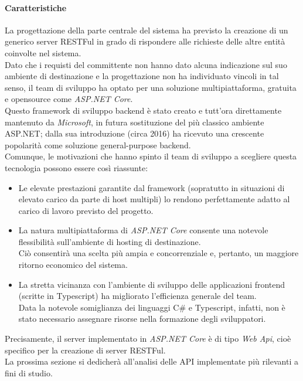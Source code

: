 \documentclass[12pt]{article}
\begin{document}
\paragraph{Caratteristiche}
La progettazione della parte centrale del sistema ha previsto la creazione di un generico server RESTFul in grado di rispondere alle richieste delle altre entità coinvolte nel sistema.\\
Dato che i requisti del committente non hanno dato alcuna indicazione sul suo ambiente di destinazione e la progettazione non ha individuato vincoli in tal senso, il team di sviluppo ha optato per una soluzione multipiattaforma, gratuita e opensource come \textit{ASP.NET Core}.\\
Questo framework di sviluppo backend è stato creato e tutt'ora direttamente mantenuto da \textit{Microsoft}, in futura sostituzione del più classico ambiente ASP.NET; dalla sua introduzione (circa 2016) ha ricevuto una crescente popolarità come soluzione general-purpose backend.\\
Comunque, le motivazioni che hanno spinto il team di sviluppo a scegliere questa tecnologia possono essere così riassunte: 
\begin{itemize}
\item Le elevate prestazioni garantite dal framework (sopratutto in situazioni di elevato carico da parte di host multipli) lo rendono perfettamente adatto al carico di lavoro previsto del progetto.
\item La natura multipiattaforma di \textit{ASP.NET Core} consente una notevole flessibilità sull'ambiente di hosting di destinazione.\\
Ciò consentirà una scelta più ampia e concorrenziale e, pertanto, un maggiore ritorno economico del sistema.
\item La stretta vicinanza con l'ambiente di sviluppo delle applicazioni frontend (scritte in Typescript) ha migliorato l'efficienza generale del team.\\
Data la notevole somiglianza dei linguaggi C\# e Typescript, infatti, non è stato necessario assegnare risorse nella formazione degli sviluppatori.
\end{itemize}
Precisamente, il server implementato in \textit{ASP.NET Core} è di tipo \textit{Web Api}, cioè specifico per la creazione di server RESTFul.\\
La prossima sezione si dedicherà all'analisi delle API implementate più rilevanti a fini di studio.
\end{document}

